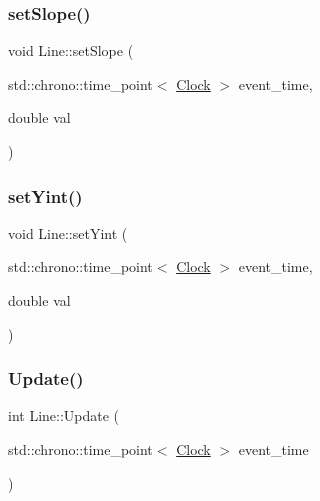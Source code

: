\mbox{\label{classLine_a3fb9e9eab13d146feff0bc891709eaf9}} 
\subsubsection{\texorpdfstring{set\+Slope()}{setSlope()}}
{\footnotesize\ttfamily void Line\+::set\+Slope (\begin{DoxyParamCaption}\item[{std\+::chrono\+::time\+\_\+point$<$ \mbox{\hyperlink{universe_8h_a0ef8d951d1ca5ab3cfaf7ab4c7a6fd80}{Clock}} $>$}]{event\+\_\+time,  }\item[{double}]{val }\end{DoxyParamCaption})\hspace{0.3cm}{\ttfamily [inline]}}

\mbox{\label{classLine_ad966eb3f1bd4cb29976b3e97811c344f}} 
\subsubsection{\texorpdfstring{set\+Yint()}{setYint()}}
{\footnotesize\ttfamily void Line\+::set\+Yint (\begin{DoxyParamCaption}\item[{std\+::chrono\+::time\+\_\+point$<$ \mbox{\hyperlink{universe_8h_a0ef8d951d1ca5ab3cfaf7ab4c7a6fd80}{Clock}} $>$}]{event\+\_\+time,  }\item[{double}]{val }\end{DoxyParamCaption})\hspace{0.3cm}{\ttfamily [inline]}}

\mbox{\label{classLine_a8c6dece66f5cd93ce40134002a40f505}} 
\subsubsection{\texorpdfstring{Update()}{Update()}}
{\footnotesize\ttfamily int Line\+::\+Update (\begin{DoxyParamCaption}\item[{std\+::chrono\+::time\+\_\+point$<$ \mbox{\hyperlink{universe_8h_a0ef8d951d1ca5ab3cfaf7ab4c7a6fd80}{Clock}} $>$}]{event\+\_\+time }\end{DoxyParamCaption})}



